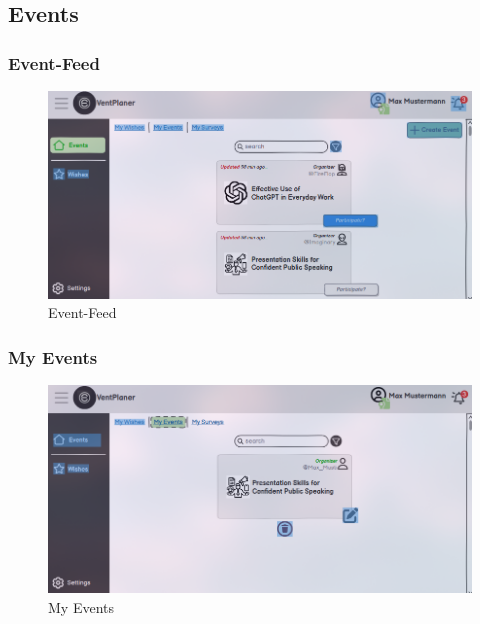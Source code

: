 \documentclass[a4paper,12pt]{article}
\begin{document}
\subsection{Events}
\subsubsection{Event-Feed}
\begin{figure}[H]
    \centering
    \includegraphics[width=1\textwidth]{Abbildungen/events/event_feed.png}
    \caption{Event-Feed}
    \label{fig:event_Feed}
  \end{figure}
\subsubsection{My Events}
\begin{figure}[H]
    \centering
    \includegraphics[width=1\textwidth]{Abbildungen/events/my_events.png}
    \caption{My Events}
    \label{fig:my_events}
  \end{figure}
\end{document}
